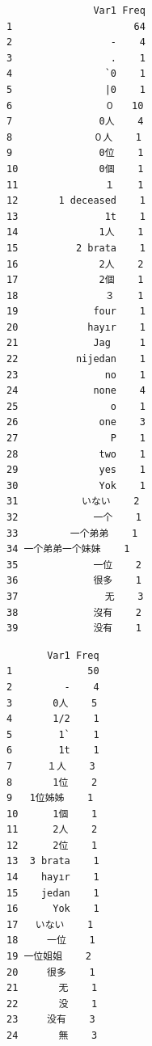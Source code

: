 \documentclass[]{article}
\newenvironment{Shaded}{\begin{snugshade}}{\end{snugshade}}
\newcommand{\KeywordTok}[1]{\textcolor[rgb]{0.94,0.87,0.69}{{#1}}}
\newcommand{\StringTok}[1]{\textcolor[rgb]{0.80,0.58,0.58}{{#1}}}
\newcommand{\CommentTok}[1]{\textcolor[rgb]{0.50,0.62,0.50}{{#1}}}
\newcommand{\NormalTok}[1]{\textcolor[rgb]{0.80,0.80,0.80}{{#1}}}
\begin{document}
\begin{verbatim}
               Var1 Freq
1                     64
2                 -    4
3                 .    1
4                `0    1
5                |0    1
6                ０   10
7               0人    4
8              ０人    1
9               0位    1
10              0個    1
11               １    1
12       1 deceased    1
13               1t    1
14              1人    1
15          2 brata    1
16              2人    2
17              2個    1
18               ３    1
19             four    1
20            hayır    1
21             Jag     1
22          nijedan    1
23               no    1
24             none    4
25                o    1
26              one    3
27                P    1
28              two    1
29              yes    1
30              Yok    1
31           いない    2
32             一个    1
33         一个弟弟    1
34 一个弟弟一个妹妹    1
35             一位    2
36             很多    1
37               无    3
38             沒有    2
39             没有    1
\end{verbatim}

\begin{Shaded}
\end{Shaded}

\begin{verbatim}
       Var1 Freq
1             50
2         -    4
3       0人    5
4       1/2    1
5        1`    1
6        1t    1
7      １人    3
8       1位    2
9   1位姊姊    1
10      1個    1
11      2人    2
12      2位    1
13  3 brata    1
14    hayır    1
15    jedan    1
16      Yok    1
17   いない    1
18     一位    1
19 一位姐姐    2
20     很多    1
21       无    1
22       没    1
23     没有    3
24       無    3
\end{verbatim}
\end{document}
